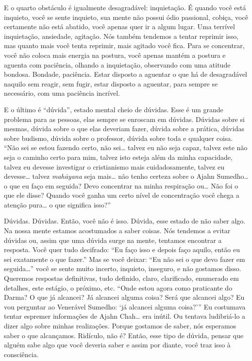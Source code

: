 E o quarto obstáculo é igualmente desagradável: inquietação. É
quando você está inquieto, você se sente inquieto, sua mente não possui
ódio passional, cobiça, você certamente não está abatido, você apenas
quer ir a algum lugar. Uma terrível inquietação, ansiedade, agitação.
Nós também tendemos a tentar reprimir isso, mas quanto mais você tenta
reprimir, mais agitado você fica. Para se concentrar, você não coloca
mais energia na postura, você apenas mantém a postura e aguenta com
paciência, olhando a inquietação, observando com uma atitude bondosa.
Bondade, paciência. Estar disposto a aguentar o que há de desagradável
naquilo sem reagir, sem fugir, estar disposto a aguentar, para sempre
se necessário, com uma paciência incrível.

E o último é “dúvida”, estado mental cheio de dúvidas. Esse é um
grande problema para as pessoas, elas sempre se enroscam em dúvidas.
Dúvidas sobre si mesmas, dúvida sobre o que elas deveriam fazer, dúvida
sobre a prática, dúvidas sobre budismo, dúvida sobre o professor,
dúvida sobre toda e qualquer coisa. “Não sei se estou fazendo certo,
não sei… talvez eu não seja capaz, talvez este não seja o caminho certo
para mim, talvez isto esteja além da minha capacidade, talvez eu
devesse investigar o cristianismo mais cuidadosamente, talvez eu
devesse… talvez \textit{mah\=ayana} seja mais… não tenho certeza sobre
o Ajahn Sumedho… o que eu faço em seguida? Devo concentrar na minha
respiração ou… Não foi o que ele disse? Quando você ganha um certo
nível de concentração você chega a atenção pura… o que significa isso?”

Dúvidas. Dúvidas. Então, você não é isso. Dúvida, esse estado de não
saber algo. Na nossa mente estamos acostumados a saber coisas. Nós
tendemos a evitar dúvidas ou, assim que uma dúvida surge na mente,
tentamos encontrar a resposta. Você quer tudo decifrado: “Eu faço isso
e depois faço aquilo, então eu sei exatamente o que fazer.” Mas se você
deixar: “Eu não sei o que devo fazer em seguida…” você se sente muito
incerto, inquieto, inseguro, e não gostamos disso. Queremos respostas
definitivas, tudo definido, claro, clarificado, enumerado em detalhes,
este estágio, o próximo, etc. “Onde estou agora como praticante do
Darma? O que já alcancei? Já alcancei alguma coisa? Será que alcancei
algo? Eu vou perguntar ao Venerável Sumedho: ‘já alcancei alguma
coisa?’” Eu costumava tentar espremer informações de Ajahn Chah… era
inútil. Ou tentava ludibriá-lo a dizer algo sobre minhas realizações.
Porque gostamos de saber, nós esperamos saber o que alcançamos.
Ridículo, não é? Então, esse tipo de dúvida, pensar que alguém sabe
algo que você deveria saber e assim por diante, você traz isso à
consciência. 

